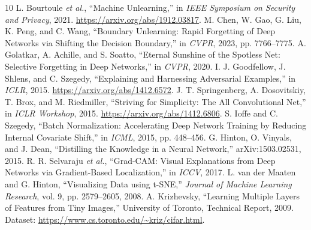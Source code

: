 \documentclass[conference]{IEEEtran}
\begin{document}
\begin{thebibliography}{10}
L. Bourtoule \textit{et al.}, ``Machine Unlearning,'' in \textit{IEEE Symposium on Security and Privacy}, 2021. \url{https://arxiv.org/abs/1912.03817}.
M. Chen, W. Gao, G. Liu, K. Peng, and C. Wang, ``Boundary Unlearning: Rapid Forgetting of Deep Networks via Shifting the Decision Boundary,'' in \textit{CVPR}, 2023, pp. 7766--7775.
A. Golatkar, A. Achille, and S. Soatto, ``Eternal Sunshine of the Spotless Net: Selective Forgetting in Deep Networks,'' in \textit{CVPR}, 2020.
I. J. Goodfellow, J. Shlens, and C. Szegedy, ``Explaining and Harnessing Adversarial Examples,'' in \textit{ICLR}, 2015. \url{https://arxiv.org/abs/1412.6572}.
J. T. Springenberg, A. Dosovitskiy, T. Brox, and M. Riedmiller, ``Striving for Simplicity: The All Convolutional Net,'' in \textit{ICLR Workshop}, 2015. \url{https://arxiv.org/abs/1412.6806}.
S. Ioffe and C. Szegedy, ``Batch Normalization: Accelerating Deep Network Training by Reducing Internal Covariate Shift,'' in \textit{ICML}, 2015, pp. 448--456.
G. Hinton, O. Vinyals, and J. Dean, ``Distilling the Knowledge in a Neural Network,'' arXiv:1503.02531, 2015.
R. R. Selvaraju \textit{et al.}, ``Grad-CAM: Visual Explanations from Deep Networks via Gradient-Based Localization,'' in \textit{ICCV}, 2017.
L. van der Maaten and G. Hinton, ``Visualizing Data using t-SNE,'' \textit{Journal of Machine Learning Research}, vol. 9, pp. 2579--2605, 2008.
A. Krizhevsky, ``Learning Multiple Layers of Features from Tiny Images,'' University of Toronto, Technical Report, 2009. Dataset: \url{https://www.cs.toronto.edu/~kriz/cifar.html}.
\end{thebibliography}
\onecolumn
\appendices
\end{document}
